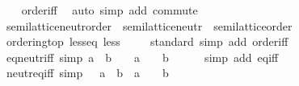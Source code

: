 \begin{isabellebody}
%
\isadelimproof
\ \ %
\endisadelimproof
%
\isatagproof
{}\isamarkupfalse%
\ order{\isacharunderscore}{\kern0pt}iff\ \isamarkupfalse%
\ {\isacharparenleft}{\kern0pt}auto\ simp\ add{\isacharcolon}{\kern0pt}\ commute{\isacharparenright}{\kern0pt}%
\endisatagproof
{\isafoldproof}%
%
\isadelimproof
\isanewline
%
\endisadelimproof
\isanewline
{}\isamarkupfalse%
\isanewline
\isanewline
{}\isamarkupfalse%
\ semilattice{\isacharunderscore}{\kern0pt}neutr{\isacharunderscore}{\kern0pt}order\ {\isacharequal}{\kern0pt}\ semilattice{\isacharunderscore}{\kern0pt}neutr\ {\isacharplus}{\kern0pt}\ semilattice{\isacharunderscore}{\kern0pt}order\isanewline
{}\isanewline
\isanewline
{}\isamarkupfalse%
\ ordering{\isacharunderscore}{\kern0pt}top\ less{\isacharunderscore}{\kern0pt}eq\ less\ {\isachardoublequoteopen}\isanewline
%
\isadelimproof
\ \ %
\endisadelimproof
%
\isatagproof
{}\isamarkupfalse%
\ standard\ {\isacharparenleft}{\kern0pt}simp\ add{\isacharcolon}{\kern0pt}\ order{\isacharunderscore}{\kern0pt}iff{\isacharparenright}{\kern0pt}%
\endisatagproof
{\isafoldproof}%
%
\isadelimproof
\isanewline
%
\endisadelimproof
\isanewline
{}\isamarkupfalse%
\ eq{\isacharunderscore}{\kern0pt}neutr{\isacharunderscore}{\kern0pt}iff\ {\isacharbrackleft}{\kern0pt}simp{\isacharbrackright}{\kern0pt}{\isacharcolon}{\kern0pt}\ {\isacartoucheopen}a\ \isactrlbold {\isacharasterisk}{\kern0pt}\ b\ {\isacharequal}{\kern0pt}\ \ {\isasymlongleftrightarrow}\ a\ {\isacharequal}{\kern0pt}\ \ {\isasymand}\ b\ {\isacharequal}{\kern0pt}\ \isanewline
%
\isadelimproof
\ \ %
\endisadelimproof
%
\isatagproof
{}\isamarkupfalse%
\ {\isacharparenleft}{\kern0pt}simp\ add{\isacharcolon}{\kern0pt}\ eq{\isacharunderscore}{\kern0pt}iff{\isacharparenright}{\kern0pt}%
\endisatagproof
{\isafoldproof}%
%
\isadelimproof
\isanewline
%
\endisadelimproof
\isanewline
{}\isamarkupfalse%
\ neutr{\isacharunderscore}{\kern0pt}eq{\isacharunderscore}{\kern0pt}iff\ {\isacharbrackleft}{\kern0pt}simp{\isacharbrackright}{\kern0pt}{\isacharcolon}{\kern0pt}\ {\isacartoucheopen}\ {\isacharequal}{\kern0pt}\ a\ \isactrlbold {\isacharasterisk}{\kern0pt}\ b\ {\isasymlongleftrightarrow}\ a\ {\isacharequal}{\kern0pt}\ \ {\isasymand}\ b\ {\isacharequal}{\kern0pt}\ \isanewline

\end{isabellebody}
